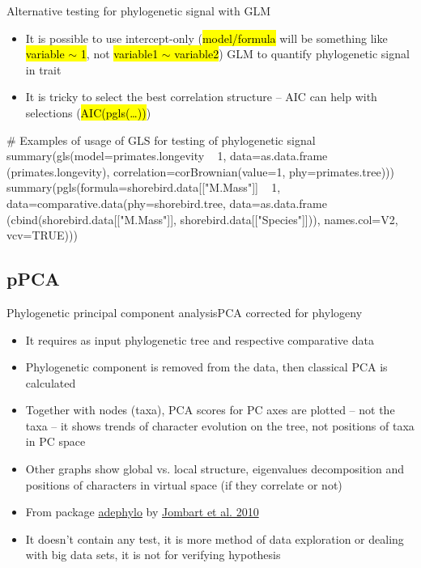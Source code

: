 \documentclass[compress, ucs, xelatex, 11pt, xcolor=svgnames,
  hyperref={
    bookmarks=true,
    unicode=true,
    colorlinks=true,
    pdftitle={Molecular data in R},
    plainpages=false,
    pdfauthor={Vojtech Zeisek},
    pdfsubject={Course about phylogeny and evolution in R},
    pdfcreator={XeLaTeX},
    pdfkeywords={R, evolution, phylogeny, molecular data},
    linkcolor=Tomato,
    anchorcolor=SaddleBrown,
    citecolor=Goldenrod,
    filecolor=DarkMagenta,
    menucolor=Sienna,
    urlcolor=DarkTurquoise,
    pdftex},
  url={hyphens, lowtilde} %
  ]{beamer}
\renewcommand{\texttt}[1]{\hl{\ttfamily #1}}
\begin{document}
\begin{frame}[fragile]{Alternative testing for phylogenetic signal with GLM}
  \begin{itemize}
    \item It is possible to use intercept-only (\texttt{model/formula} will be something like \texttt{variable $\sim$ 1}, not \texttt{variable1 $\sim$ variable2}) GLM to quantify phylogenetic signal in trait
    \item It is tricky to select the best correlation structure -- AIC can help with selections (\texttt{AIC(pgls(\ldots))})
  \end{itemize}
  \begin{spluscode}
    # Examples of usage of GLS for testing of phylogenetic signal
    summary(gls(model=primates.longevity ~ 1, data=as.data.frame
      (primates.longevity), correlation=corBrownian(value=1,
      phy=primates.tree)))
    summary(pgls(formula=shorebird.data[["M.Mass"]] ~ 1,
      data=comparative.data(phy=shorebird.tree, data=as.data.frame
      (cbind(shorebird.data[["M.Mass"]], shorebird.data[["Species"]])),
      names.col=V2, vcv=TRUE)))
  \end{spluscode}
\end{frame}

\subsection{pPCA}

\begin{frame}{Phylogenetic principal component analysis}{PCA corrected for phylogeny}
  \begin{itemize}
    \item It requires as input phylogenetic tree and respective comparative data
    \item Phylogenetic component is removed from the data, then classical PCA is calculated
    \item Together with nodes (taxa), PCA scores for PC axes are plotted -- not the taxa -- it shows trends of character evolution on the tree, not positions of taxa in PC space
    \item Other graphs show global vs. local structure, eigenvalues decomposition and positions of characters in virtual space (if they correlate or not)
    \item From package \href{https://academic.oup.com/bioinformatics/article-lookup/doi/10.1093/bioinformatics/btq292}{adephylo} by \href{https://www.sciencedirect.com/science/article/pii/S0022519310001736}{Jombart et al. 2010}
    \item It doesn't contain any test, it is more method of data exploration or dealing with big data sets, it is not for verifying hypothesis
  \end{itemize}
\end{frame}
\end{document}

